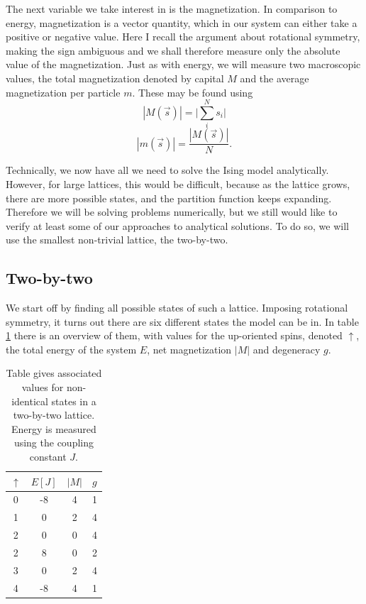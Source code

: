 \documentclass[english,notitlepage,reprint,nofootinbib]{revtex4-1}  %
\begin{document}
The next variable we take interest in is the magnetization. In comparison to energy, magnetization is a vector quantity, which in our system can either take a positive or negative value. Here I recall the argument about rotational symmetry, making the sign ambiguous and we shall therefore measure only the absolute value of the magnetization. Just as with energy,  we will measure two macroscopic values, the total magnetization denoted by capital $M$ and the average magnetization per particle $m$. These may be found using
\begin{equation}
    |M(\vec{s})| = \Big|\sum_i ^N s_i \Big|
\end{equation}
\begin{equation}
    |m(\vec{s})| = \frac{|M(\vec{s})|}{N}.
\end{equation}


 Technically, we now have all we need to solve the Ising model analytically. However, for large lattices, this would be difficult, because as the lattice grows, there are more possible states, and the partition function keeps expanding. Therefore we will be solving problems numerically, but we still would like to verify at least some of our approaches to analytical solutions. To do so, we will use the smallest non-trivial lattice, the two-by-two.

\subsection{Two-by-two}
 
 We start off by finding all possible states of such a lattice. Imposing rotational symmetry, it turns out there are six different states the model can be in. In table \ref{table:1} there is an overview of them, with values for the up-oriented spins, denoted $\uparrow$, the total energy of the system $E$, net magnetization $|M|$ and degeneracy $g$.


\begin{table}[h!]
\centering
\begin{tabular}{||c c c c||} 
 \hline
  $\uparrow$ & $E[J]$ & $|M|$ & $g$ \\ [0.5ex] 
 \hline\hline
 0 & -8 & 4 & 1 \\ 
 1 & 0 & 2 & 4 \\
 2 & 0 & 0 & 4 \\
 2 & 8 & 0 & 2 \\
 3 & 0 & 2 & 4 \\ 
 4 & -8 & 4 & 1 \\ [1ex] 
 \hline
\end{tabular}
\caption{Table gives associated values for non-identical states in a two-by-two lattice. Energy is measured using the coupling constant $J$.}
\label{table:1}
\end{table}
\end{document}
